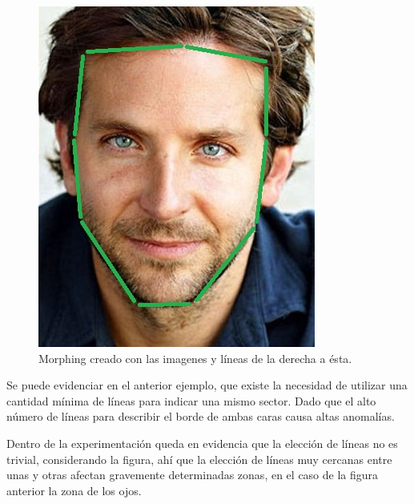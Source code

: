 \documentclass[conference]{IEEEtran}
\begin{document}
\begin{figure}[H]
\begin{multicols}{3}
    \includegraphics[width=0.65\linewidth]{extra/errors/02/2 lines.jpg} \par
   
\end{multicols}
\caption{Morphing creado con las imagenes y líneas de la derecha a ésta.}
\end{figure}	

	Se puede evidenciar en el anterior ejemplo, que existe la necesidad de utilizar una cantidad mínima de líneas para indicar una mismo sector. Dado que el alto número de líneas para describir el borde de ambas caras causa altas anomalías.
	
	Dentro de la experimentación queda en evidencia que la elección de líneas no es trivial, considerando la figura, ahí que la elección de líneas muy cercanas entre unas y otras afectan gravemente determinadas zonas, en el caso de la figura anterior la zona de los ojos.
		
\end{document}
